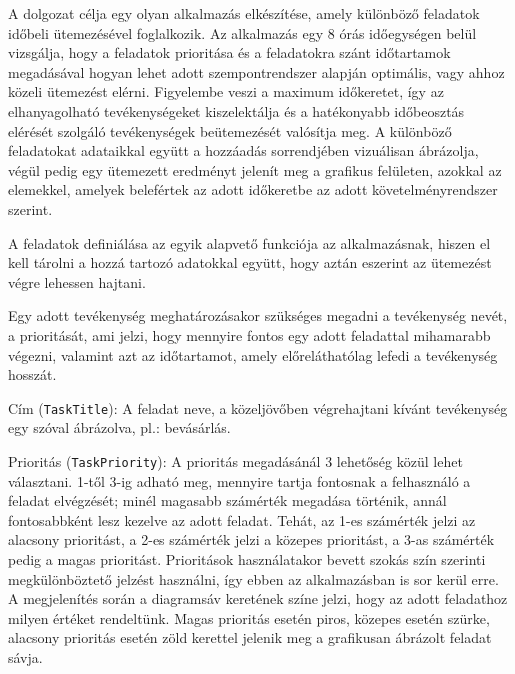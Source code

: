 

A dolgozat célja egy olyan alkalmazás elkészítése, amely különböző feladatok időbeli ütemezésével foglalkozik. Az alkalmazás egy 8 órás időegységen belül vizsgálja, hogy a feladatok prioritása és a feladatokra szánt időtartamok megadásával hogyan lehet adott szempontrendszer alapján optimális, vagy ahhoz közeli ütemezést elérni. Figyelembe veszi a maximum időkeretet, így az elhanyagolható tevékenységeket kiszelektálja és a hatékonyabb időbeosztás elérését szolgáló tevékenységek beütemezését valósítja meg. A különböző feladatokat adataikkal együtt a hozzáadás sorrendjében vizuálisan ábrázolja, végül pedig egy ütemezett eredményt jelenít meg a grafikus felületen, azokkal az elemekkel, amelyek belefértek az adott időkeretbe az adott követelményrendszer szerint.


A feladatok definiálása az egyik alapvető funkciója az alkalmazásnak, hiszen el kell tárolni a hozzá tartozó adatokkal együtt, hogy aztán eszerint az ütemezést végre lehessen hajtani. 


Egy adott tevékenység meghatározásakor szükséges megadni a tevékenység nevét, a prioritását, ami jelzi, hogy mennyire fontos egy adott feladattal mihamarabb végezni, valamint azt az időtartamot, amely előreláthatólag lefedi a tevékenység hosszát.

Cím (\texttt{TaskTitle}): A feladat neve, a közeljövőben végrehajtani kívánt tevékenység egy szóval ábrázolva, pl.: bevásárlás.

Prioritás (\texttt{TaskPriority}): A prioritás megadásánál 3 lehetőség közül lehet választani. 1-től 3-ig adható meg, mennyire tartja fontosnak a felhasználó a feladat elvégzését; minél magasabb számérték megadása történik, annál fontosabbként lesz kezelve az adott feladat. Tehát, az 1-es számérték jelzi az alacsony prioritást, a 2-es számérték jelzi a közepes prioritást, a 3-as számérték pedig a magas prioritást. Prioritások használatakor bevett szokás szín szerinti megkülönböztető jelzést használni, így ebben az alkalmazásban is sor kerül erre. A megjelenítés során a diagramsáv keretének színe jelzi, hogy az adott feladathoz milyen értéket rendeltünk. Magas prioritás esetén piros, közepes esetén szürke, alacsony prioritás esetén zöld kerettel jelenik meg a grafikusan ábrázolt feladat sávja.

